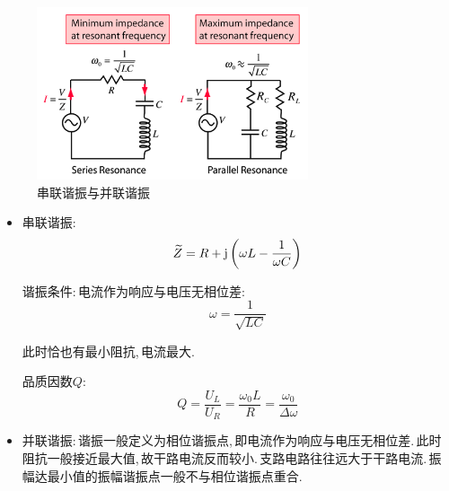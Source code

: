 \begin{figure}[H]
\centering
\includegraphics[width=8cm]{image/7-7-1.png}
\caption{串联谐振与并联谐振}
\end{figure}
\begin{itemize}
\item 串联谐振:
\[\widetilde{Z}=R+{\rm j}\left(\omega L-\frac{1}{\omega C}\right)\]

谐振条件:\,电流作为响应与电压无相位差:
\[\omega=\frac{1}{\sqrt{LC}}\]

此时恰也有最小阻抗,\,电流最大.

品质因数$Q$:
\[Q=\frac{U_L}{U_R}=\frac{\omega_0 L}{R}=\frac{\omega_0}{\Delta \omega}\]

\item 并联谐振:\,谐振一般定义为相位谐振点,\,即电流作为响应与电压无相位差.\,此时阻抗一般接近最大值,\,故干路电流反而较小.\,支路电路往往远大于干路电流.\,振幅达最小值的振幅谐振点一般不与相位谐振点重合.



\end{itemize}









